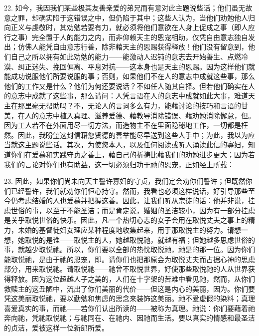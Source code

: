 22. 如今，我因我们某些极其友善亲爱的弟兄而有意对此主题说些话；他们虽无故意之罪，却确实陷于这错误之中，但仍陷于其中；这些人认为，当他们劝勉他人归向正义与虔敬时，其劝勉若要有力，就必须将他们意欲在人身上促成之事（即人应行之事）完全置于人的能力之内，而非仰赖天主的恩宠相助，仅凭自由意志独自发出；仿佛人能凭自由意志行善，除非藉天主的恩赐获得释放！他们没有留意到，他们自己之所以拥有如此劝勉的能力——能激动人迟钝的意志去开始善生、点燃冷漠、纠正迷失、挽回偏离、平息对抗——这本身也是天主的恩赐。因为这样他们就能成功说服他们所要说服的事；否则，如果他们不在人的意志中成就这些事，那么他们的工作又是什么？他们为何还要说话？不如任人随其自择。但若他们确实在人的意志中成就了这些事，那么请问：人凭言语在人的意志中成就如此大事，难道天主在那里毫无帮助吗？不，无论人的言词多么有力，能藉讨论的技巧和言语的甘美，在人的意志中植入真理、滋养爱德、藉教导消除错误、藉劝勉消除懈怠，但。因为工人若不在外面用尽一切方法，而造物主不在里面隐秘地工作，一切都是枉然。因此，我盼望这封信藉您贤德的善举能尽早送到这些人手中；为此，我以为应当就这主题说些话。其次，为使您本人，以及任何阅读或听人诵读此信的寡妇，知道你们在爱慕和实践守贞之善上，藉自己的祈祷比藉我们的劝勉进步更大；因为若我们的言论对你们也有助益，这一切必须归功于祂的恩宠，正如经上所载：\par

23. 因此，如果你们尚未向天主誓许寡妇的守贞，我们定会劝你们誓许；但既然你们已经誓许，我们就劝你们恒心持守。然而，我看也必须这样说话，好引导那些至今仍考虑结婚的人也爱慕并把握这善。因此，让我们听从宗徒的话：他并非说，挂虑世俗的事，以至于不能圣洁；而是肯定说，婚姻的圣洁较小，因为有一部分挂虑是关乎取悦世俗的快乐。因此，凡一个热切心志的女子会用在取悦丈夫之事上的精力，未婚的基督徒妇女理应某种程度地收集起来，用于那取悦主的努力。请想一想，她取悦的是谁——取悦主的人，她越取悦祂，就越有福；但她越多思虑世俗的事，就越少取悦祂。所以，你们要以全部的热忱取悦祂，祂是的那一位。因为你们能取悦祂，是由于祂的恩宠，即。请你们也把那原会为取悦丈夫而占据心神的思虑部分，用来取悦祂。请取悦祂——祂曾不取悦世界，好使那些取悦祂的人从世界获得释放。因为这位超越人子之美的，人们在十字架的苦难中看见祂，然而，从你们救赎主的这丑陋中，流出了你们美丽的代价——但这是内心的美丽，因为。你们要凭这美丽取悦祂，要以勤勉和焦虑的思念来装饰这美丽。祂不爱虚假的染料；真理喜爱真实的事，而祂——若你们认出所读的——被称为真理。祂说：你们要藉着祂奔向祂，凭祂取悦祂；与祂同在、在祂内、因祂而生活。要以真实的情感和最圣洁的贞洁，爱被这样一位新郎所爱。\par

